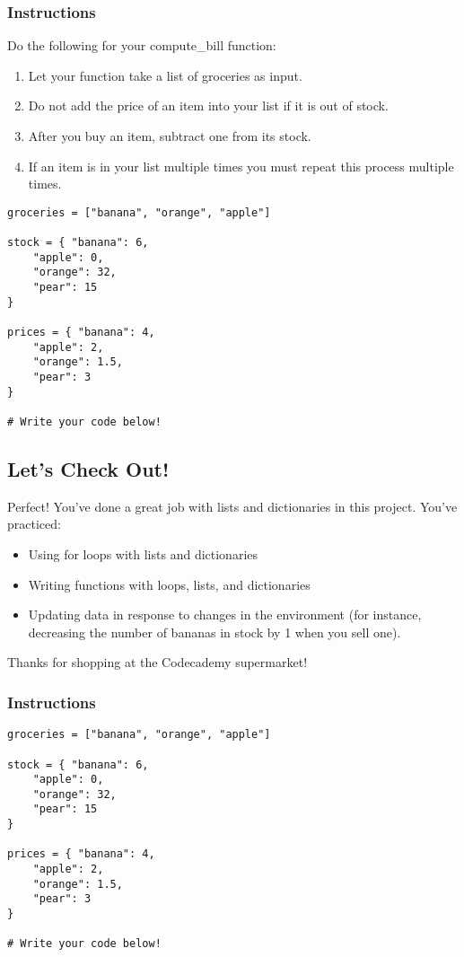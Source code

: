 \documentclass[12pt,a4paper,final,twoside,onecolumn,titlepage]{book}
\begin{document}
\subsubsection{Instructions}

Do the following for your compute\_bill function:
\begin{enumerate}
\item    Let your function take a list of groceries as input.
\item    Do not add the price of an item into your list if it is out of stock.
\item    After you buy an item, subtract one from its stock.
\item    If an item is in your list multiple times you must repeat this process multiple times.
\end{enumerate}

\begin{lstlisting}
groceries = ["banana", "orange", "apple"]

stock = { "banana": 6,
    "apple": 0,
    "orange": 32,
    "pear": 15
}
    
prices = { "banana": 4,
    "apple": 2,
    "orange": 1.5,
    "pear": 3
}

# Write your code below!
\end{lstlisting}

\subsection{Let's Check Out!}

Perfect! You've done a great job with lists and dictionaries in this project. You've practiced:
\begin{itemize}
\item    Using for loops with lists and dictionaries
\item    Writing functions with loops, lists, and dictionaries
\item    Updating data in response to changes in the environment (for instance, decreasing the number of bananas in stock by 1 when you sell one).
\end{itemize}
Thanks for shopping at the Codecademy supermarket!
\subsubsection{Instructions}

\begin{lstlisting}
groceries = ["banana", "orange", "apple"]

stock = { "banana": 6,
    "apple": 0,
    "orange": 32,
    "pear": 15
}
    
prices = { "banana": 4,
    "apple": 2,
    "orange": 1.5,
    "pear": 3
}

# Write your code below!
\end{lstlisting}
\end{document}
